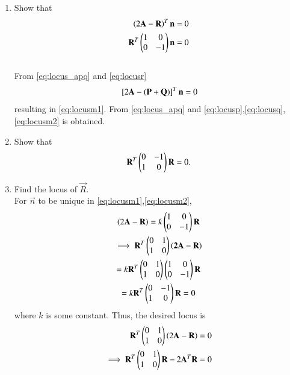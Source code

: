 \documentclass[journal,12pt,twocolumn]{IEEEtran}
\renewcommand\thesection{\arabic{section}}
\begin{document}
\begin{enumerate}[label=\thesection.\arabic*
,ref=\thesection.\theenumi]
\begin{align}
\begin{split}
\end{split}
\label{eq:locus_apq}
\end{align}
\\
\solution 
Trivial using \eqref{eq:line_normal} and \eqref{eq:normal_slope}.
%
\item Show that
\begin{align}
\left(2\mathbf{A}-\mathbf{R}\right)^T\mathbf{n} &= 0
\label{eq:locusm1}
\\
\label{eq:locusm2}
\mathbf{R}^T\begin{pmatrix}1 & 0\\ 0 & -1\end{pmatrix}\mathbf{n} &= 0
\end{align}
\\
\solution
From \eqref{eq:locus_apq} and \eqref{eq:locusr}
\begin{align}
{}\left[2\mathbf{A}-\left(\mathbf{P}+\mathbf{Q}\right)\right]^T\mathbf{n} = 0
\end{align}
%
resulting in  \eqref{eq:locusm1}.
From \eqref{eq:locus_apq} and \eqref{eq:locusp},\eqref{eq:locusq}, \eqref{eq:locusm2} is obtained.
%
\item Show that
\begin{equation}
\mathbf{R}^{T}\begin{pmatrix}0 & -1\\ 1 & 0\end{pmatrix}\mathbf{R} = 0.
\end{equation}
\item Find the locus of $\vec{R}$.
\\
\solution
For $\vec{n}$ to be unique in \eqref{eq:locusm1},\eqref{eq:locusm2},
\begin{multline}
\left(2\mathbf{A}-\mathbf{R}\right) = k \begin{pmatrix}1 & 0\\ 0 & -1\end{pmatrix}\mathbf{R}
\\
\implies \mathbf{R}^{T}\begin{pmatrix}0 & 1\\ 1 & 0\end{pmatrix}\left(\mathbf{2A}-\mathbf{R}\right) 
\\
= k \mathbf{R}^{T}\begin{pmatrix}0 & 1\\ 1 & 0\end{pmatrix}\begin{pmatrix}1 & 0\\ 0 & -1\end{pmatrix}\mathbf{R}
\\
= k \mathbf{R}^{T}\begin{pmatrix}0 & -1\\ 1 & 0\end{pmatrix}\mathbf{R} = 0
\end{multline}
%
where $k$ is some constant.  Thus, the desired locus is
\begin{align}
 \mathbf{R}^{T}\begin{pmatrix}0 & 1\\ 1 & 0\end{pmatrix}\left(2\mathbf{A}-\mathbf{R}\right) 
&= 0
\\
\implies \mathbf{R}^{T}\begin{pmatrix}0 & 1\\ 1 & 0\end{pmatrix}\mathbf{R}- 2\mathbf{A}^T\mathbf{R}
&= 0
\end{align}
\end{enumerate}
%
\end{document}
